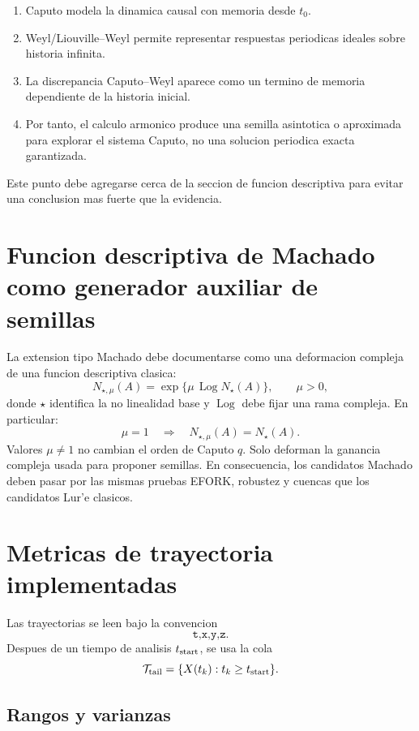 \documentclass[11pt]{article}
\begin{document}
\begin{enumerate}[label=\textbf{(\roman*)},leftmargin=1.6cm]
\item Caputo modela la dinamica causal con memoria desde \(t_0\).
\item Weyl/Liouville--Weyl permite representar respuestas periodicas ideales
sobre historia infinita.
\item La discrepancia Caputo--Weyl aparece como un termino de memoria
dependiente de la historia inicial.
\item Por tanto, el calculo armonico produce una semilla asintotica o
aproximada para explorar el sistema Caputo, no una solucion periodica exacta
garantizada.
\end{enumerate}

Este punto debe agregarse cerca de la seccion de funcion descriptiva para
evitar una conclusion mas fuerte que la evidencia.

\section{Funcion descriptiva de Machado como generador auxiliar de semillas}

La extension tipo Machado debe documentarse como una deformacion compleja de
una funcion descriptiva clasica:
\begin{equation}
\label{eq:machado_fdf_general}
N_{\star,\mu}(A)=\exp\{\mu\,\operatorname{Log}N_\star(A)\},
\qquad \mu>0,
\end{equation}
donde \(\star\) identifica la no linealidad base y \(\operatorname{Log}\) debe
fijar una rama compleja. En particular:
\[
\mu=1
\quad\Longrightarrow\quad
N_{\star,\mu}(A)=N_\star(A).
\]
Valores \(\mu\neq1\) no cambian el orden de Caputo \(q\). Solo deforman la
ganancia compleja usada para proponer semillas. En consecuencia, los candidatos
Machado deben pasar por las mismas pruebas EFORK, robustez y cuencas que los
candidatos Lur'e clasicos.

\section{Metricas de trayectoria implementadas}

Las trayectorias se leen bajo la convencion
\[
\texttt{t,x,y,z}.
\]
Despues de un tiempo de analisis \(t_{\rm start}\), se usa la cola
\[
\mathcal T_{\rm tail}
=
\{X(t_k):t_k\geq t_{\rm start}\}.
\]

\subsection{Rangos y varianzas}
\end{document}
